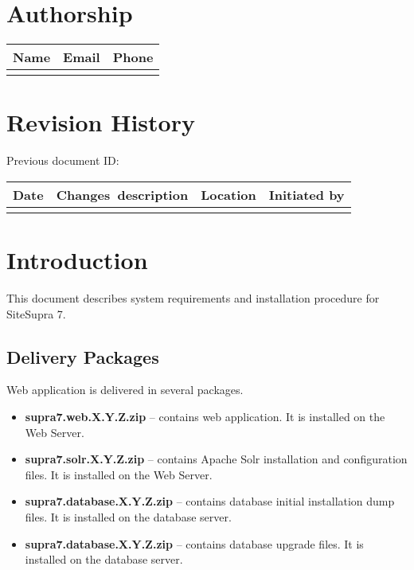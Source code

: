\documentclass[12pt]{article}
\newcommand{\vigProjectName}{SiteSupra 7}
\newcommand{\vigPackageName}{supra7}
\begin{document}
\section*{Authorship}

\begin{tabularx}{\textwidth}{X X X}
 \textbf{Name} & \textbf{Email} & \textbf{Phone} \\
 \hline\noalign{\smallskip}
\end{tabularx}

\section*{Revision History}
Previous document ID:

\begin{tabularx}{\textwidth}{l X l l}
 \textbf{Date} & \textbf{\mbox{Changes description}} & \textbf{Location} & \textbf{Initiated by} \\
 \hline\noalign{\smallskip}
\end{tabularx}

\newpage

\section{Introduction}

This document describes system requirements and installation procedure for {\vigProjectName}.

\subsection{Delivery Packages}

Web application is delivered in several packages.

\begin{itemize}
	\item \textbf{{\vigPackageName}.web.X.Y.Z.zip} -- contains web application. It is installed on the Web Server.
	\item \textbf{{\vigPackageName}.solr.X.Y.Z.zip} -- contains Apache Solr installation and configuration files. It is installed on the Web Server.
	\item \textbf{{\vigPackageName}.database.X.Y.Z.zip} -- contains database initial installation dump files. It is installed on the database server.
	\item \textbf{{\vigPackageName}.database.X.Y.Z.zip} -- contains database upgrade files. It is installed on the database server.
\end{itemize}
\end{document}
